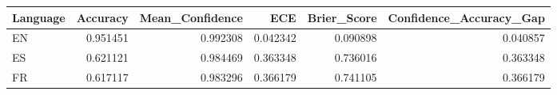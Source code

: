 \begin{tabular}{lrrrrr}
\toprule
Language & Accuracy & Mean_Confidence & ECE & Brier_Score & Confidence_Accuracy_Gap \\
\midrule
EN & 0.951451 & 0.992308 & 0.042342 & 0.090898 & 0.040857 \\
ES & 0.621121 & 0.984469 & 0.363348 & 0.736016 & 0.363348 \\
FR & 0.617117 & 0.983296 & 0.366179 & 0.741105 & 0.366179 \\
\bottomrule
\end{tabular}
